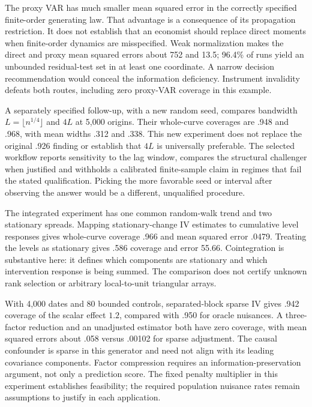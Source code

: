 The proxy VAR has much smaller mean squared error in the correctly
specified finite-order generating law. That advantage is a consequence of
its propagation restriction. It does not establish that an economist should
replace direct moments when finite-order dynamics are misspecified. Weak
normalization makes the direct and proxy mean squared errors about 752
and 13.5; 96.4\% of runs yield an unbounded residual-test set in at least
one coordinate. A narrow decision recommendation would conceal the
information deficiency. Instrument invalidity defeats both routes, including
zero proxy-VAR coverage in this example.

A separately specified follow-up, with a new random seed, compares bandwidth
$L=\lfloor n^{1/4}\rfloor$ and $4L$ at 5,000 origins. Their whole-curve
coverages are .948 and .968, with mean widths .312 and .338. This new
experiment does not replace the original .926 finding or establish that
$4L$ is universally preferable. The selected workflow reports sensitivity
to the lag window, compares the structural challenger when justified and
withholds a calibrated finite-sample claim in regimes that fail the stated
qualification. Picking the more favorable seed or interval after observing
the answer would be a different, unqualified procedure.

The integrated experiment has one common random-walk trend and two stationary
spreads. Mapping stationary-change IV estimates to cumulative level responses
gives whole-curve coverage .966 and mean squared error .0479. Treating the
levels as stationary gives .586 coverage and error 55.66. Cointegration is
substantive here: it defines which components are stationary and which
intervention response is being summed. The comparison does not certify
unknown rank selection or arbitrary local-to-unit triangular arrays.

With 4,000 dates and 80 bounded controls, separated-block sparse IV gives
.942 coverage of the scalar effect $1.2$, compared with .950 for oracle
nuisances. A three-factor reduction and an unadjusted estimator both have
zero coverage, with mean squared errors about .058 versus .00102 for
sparse adjustment. The causal confounder is sparse in this generator and
need not align with its leading covariance components. Factor compression
requires an information-preservation argument, not only a prediction score.
The fixed penalty multiplier in this experiment establishes feasibility;
the required population nuisance rates remain assumptions to justify in
each application.


